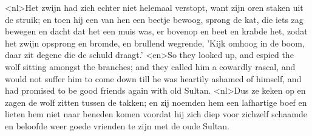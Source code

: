 <nl>Het zwijn had zich echter niet helemaal verstopt, want zijn oren staken uit de struik; en toen hij een van hen een beetje bewoog, sprong de kat, die iets zag bewegen en dacht dat het een muis was, er bovenop en beet  en krabde het, zodat het zwijn opsprong en bromde, en brullend wegrende, 'Kijk omhoog in de boom, daar zit degene die de schuld draagt.'
<en>So they looked up, and espied the wolf sitting amongst the branches; and they called him a cowardly rascal, and would not suffer him to come down till he was heartily ashamed of himself, and had promised to be good friends again with old Sultan.
<nl>Dus ze keken op en zagen de wolf zitten tussen de takken; en zij noemden hem een lafhartige boef en lieten hem niet naar beneden komen voordat hij zich diep voor zichzelf schaamde en beloofde weer goede vrienden te zijn met de oude Sultan.

